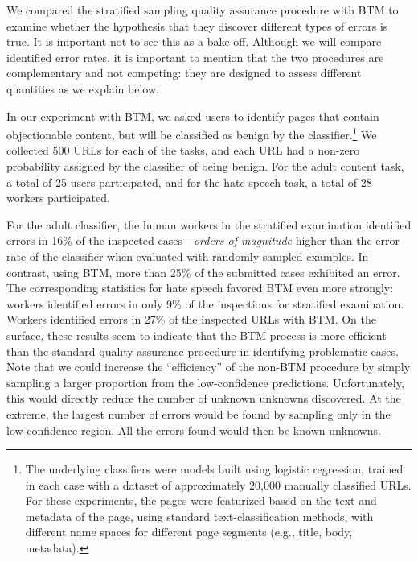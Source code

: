 We compared the stratified sampling quality assurance procedure with BTM to examine whether the hypothesis that they discover different types of errors is true.  It is important not to see this as a bake-off.  Although we will compare identified error rates, it is important to mention that the two procedures are complementary and not competing: they are designed to assess different quantities as we explain below.

In our experiment with BTM, we asked users to identify pages that contain objectionable content, but will be classified as benign by the classifier.\footnote{The underlying classifiers were models built using logistic regression, trained in each case with a dataset of approximately 20,000 manually classified URLs.  For these experiments, the pages were featurized based on the text and metadata of the page, using standard text-classification methods, with different name spaces for different page segments (e.g., title, body, metadata).}  We collected 500 URLs for each of the tasks, and each URL had a non-zero probability assigned by the classifier of being benign. For the adult content task, a total of 25 users participated, and for the hate speech task, a total of 28 workers participated. 

For the adult classifier, the human workers in the stratified examination identified errors in 16\% of the inspected cases---\textit{orders of magnitude} higher than the error rate of the classifier when evaluated with randomly sampled examples. In contrast, using BTM, more than 25\% of the submitted cases exhibited an error. The corresponding statistics for hate speech favored BTM even more strongly: workers identified errors in only 9\% of the inspections for stratified examination.  Workers identified errors in 27\% of the inspected URLs with BTM. On the surface, these results seem to indicate that the BTM process is more efficient than the standard quality assurance procedure in identifying problematic cases.  Note that we could increase the ``efficiency'' of the non-BTM procedure by simply sampling a larger proportion from the low-confidence predictions. Unfortunately, this would directly reduce the number of unknown unknowns discovered.  At the extreme, the largest number of errors would be found by sampling only in the low-confidence region.  All the errors found would then be known unknowns.



